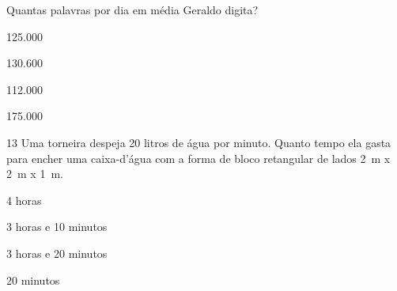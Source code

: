 Quantas palavras por dia em média Geraldo digita?

\begin{escolha}
\item 125.000
\item 130.600
\item 112.000
\item 175.000
\end{escolha}








\num{13} Uma torneira despeja 20 litros de água por minuto. Quanto tempo ela
gasta para encher uma caixa-d'água com a forma de bloco retangular de
lados 2~m x 2~m x 1~m.


\begin{escolha}
\item 4 horas
\item 3 horas e 10 minutos
\item 3 horas e 20 minutos
\item 20 minutos
\end{escolha}





